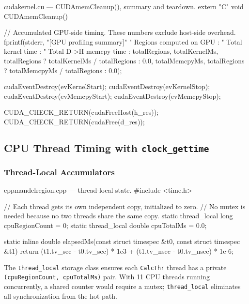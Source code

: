 \documentclass[
	english,
	letterpaper, oneside
]{article}
\begin{document}
\begin{sourcecode}{cuda}{kernel.cu — CUDAmemCleanup(), summary and teardown.}
extern "C" void CUDAmemCleanup()
{
    // Accumulated GPU-side timing. These numbers exclude host-side overhead.
    fprintf(stderr,
        "[GPU profiling summary]\n"
        "  Regions computed on GPU : %
        "  Total kernel time       : %
        "  Total D->H memcpy time  : %
        totalRegions,
        totalKernelMs, totalRegions ? totalKernelMs / totalRegions : 0.0,
        totalMemcpyMs, totalRegions ? totalMemcpyMs / totalRegions : 0.0);

    cudaEventDestroy(evKernelStart);
    cudaEventDestroy(evKernelStop);
    cudaEventDestroy(evMemcpyStart);
    cudaEventDestroy(evMemcpyStop);

    CUDA_CHECK_RETURN(cudaFreeHost(h_res));
    CUDA_CHECK_RETURN(cudaFree(d_res));
}
\end{sourcecode}

\subsection{CPU Thread Timing with \texttt{clock\_gettime}}

\subsubsection{Thread-Local Accumulators}

\begin{sourcecode}{cpp}{mandelregion.cpp — thread-local state.}
#include <time.h>

// Each thread gets its own independent copy, initialized to zero.
// No mutex is needed because no two threads share the same copy.
static thread_local long   cpuRegionCount = 0;
static thread_local double cpuTotalMs     = 0.0;

static inline double elapsedMs(const struct timespec &t0,
                                const struct timespec &t1)
{
    return (t1.tv_sec  - t0.tv_sec)  * 1e3
         + (t1.tv_nsec - t0.tv_nsec) * 1e-6;
}
\end{sourcecode}

The \texttt{thread\_local} storage class ensures each \texttt{CalcThr}
thread has a private \texttt{(cpuRegionCount, cpuTotalMs)} pair. With 11
CPU threads running concurrently, a shared counter would require a mutex;
\texttt{thread\_local} eliminates all synchronization from the hot path.
\end{document}
